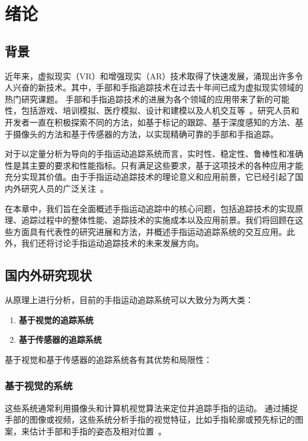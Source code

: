 \cleardoublepage

\section{绪论}

\subsection{背景}

近年来，虚拟现实（VR）和增强现实（AR）技术取得了快速发展，涌现出许多令人兴奋的新技术。其中，手部和手指追踪技术在过去十年间已成为虚拟现实领域的热门研究课题。
手部和手指追踪技术的进展为各个领域的应用带来了新的可能性，包括游戏、培训模拟、医疗模拟、设计和建模以及人机交互等~\cite{introArticle1}。研究人员和开发者一直在积极探索不同的方法，如基于标记的跟踪、基于深度感知的方法、基于摄像头的方法和基于传感器的方法，以实现精确可靠的手部和手指追踪。

对于以定量分析为导向的手指运动追踪系统而言，实时性、稳定性、鲁棒性和准确性是其主要的要求和性能指标。只有满足这些要求，基于这项技术的各种应用才能充分实现其价值。由于手指运动追踪技术的理论意义和应用前景，它已经引起了国内外研究人员的广泛关注~\cite{introArticle4}。

在本章中，我们旨在全面概述手指运动追踪中的核心问题，包括追踪技术的实现原理、追踪过程中的整体性能、追踪技术的实施成本以及应用前景。我们将回顾在这些方面具有代表性的研究进展和方法，并概述手指运动追踪系统的交互应用。此外，我们还将讨论手指运动追踪技术的未来发展方向。

\subsection{国内外研究现状}

从原理上进行分析，目前的手指运动追踪系统可以大致分为两大类：
\begin{enumerate}[label=(\alph*)]
    \item {\bfseries 基于视觉的追踪系统}
    \item {\bfseries 基于传感器的追踪系统}
\end{enumerate}

基于视觉和基于传感器的追踪系统各有其优势和局限性：
\subsubsection{基于视觉的系统}

这些系统通常利用摄像头和计算机视觉算法来定位并追踪手指的运动。
通过捕捉手部的图像或视频，这些系统分析手指的视觉特征，比如手指轮廓或预先标记的图案，来估计手部和手指的姿态及相对位置~\cite{introArticle2}。

